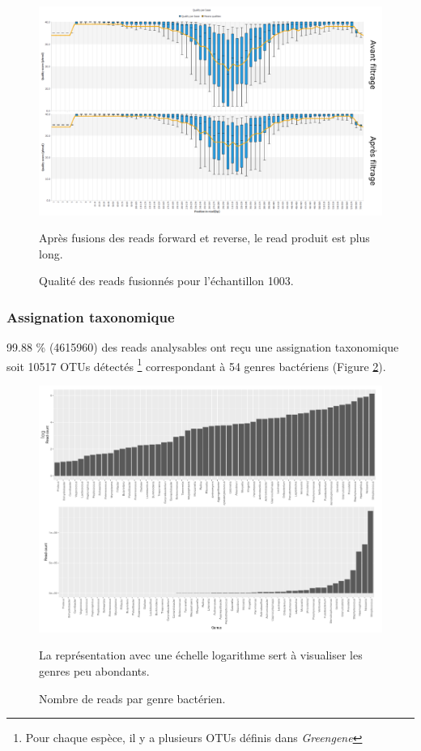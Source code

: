 \documentclass[12pt,a4paper]{article}
\begin{document}
\begin{figure}[H]
\begin{center}
\includegraphics[scale=0.4]{img/duo_merging.png}\hfill

\caption{Qualité des reads fusionnés pour l'échantillon 1003.}
Après fusions des reads forward et reverse, le read produit est plus long.
\end{center}
\label{fastqt_after}
\end{figure}


\subsubsection{Assignation taxonomique}
99.88 \% (4615960) des reads analysables ont reçu une assignation taxonomique soit 10517 OTUs détectés \footnote{Pour chaque espèce, il y a plusieurs OTUs définis dans \textit{Greengene}} correspondant à 54 genres bactériens (Figure \ref{readgenus}).


\begin{figure}
\begin{center}
\includegraphics[scale=0.8,angle=90]{img/read_count_genus_all.png}\hfill
\caption{Nombre de reads par genre bactérien.} La représentation avec une échelle logarithme sert à visualiser les genres peu abondants. 
\label{readgenus}
\end{center}

\end{figure}
\end{document}
